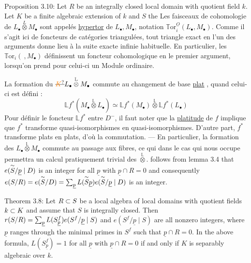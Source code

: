 Proposition 3.10: Let $R$ be an integrally closed local domain with quotient field $k$. Let $K$ be a finite algebraic extension of $k$ and $S$ the
Les  faisceaux de cohomologie de $L_{\bullet}\overset{L}{\otimes}M_{\bullet}$ sont appelés \uline{hypertor} de $L_{\bullet},M_{\bullet}$, notation $\mathbb T\mathrm{or}_i^{\underline O}(L_{\bullet},M_{\bullet})$.  Comme il s'agit ici de foncteurs  de catégories triangulées, tout triangle exact en l'un des arguments donne lieu à la suite exacte infinie habituelle. En particulier, les $\mathbb T\mathrm{or}_i(\ ,M_{\bullet})$ définissent un foncteur cohomologique en le premier argument, lorsqu'on prend pour celui-ci un Module ordinaire.

La formation du $\deleted{\unsure{K}}L_{\bullet}\overset{\mathbb L}{\otimes}M_{\bullet}$ commute au changement de base \uline{plat} , quand celui-ci est défini  : \deleted{\unsure{[mais alors}}
\[
\boxed{\mathbb L f^*(M_{\bullet}\overset{\mathbb L}{\otimes}L_{\bullet})\simeq\mathbb L f^*(M_{\bullet})\overset{\mathbb L}{\otimes}\mathbb L f^*(L_{\bullet})}
\]
Pour définir le foncteur  $\mathbb L f^*$ entre $D^-$, il faut noter que la \uline{platitude} de $f$ implique que $f^*$ transforme quasi-isomorphismes en quasi-isomorphismes. D'autre part, $f^*$ transforme plats en plats, d'où la commutation.
--- En particulier, la formation des $L_{\bullet}\overset{\mathbb L}{\otimes}M_{\bullet}$ commute au passage aux fibres, ce qui dans le cas qui nous occupe permettra  un calcul pratiquement trivial des $\overset{\mathbb L}{\otimes}$.
follows from lemma 3.4 that $e(\overset{\sim}{S}/\underline p\mid D)$ is an integer for all $\underline p$ with $\underline p\cap R=0$ and consequently $e(S/R)=e(\overset{\sim}{S}/D)=\sum_{\underline p}L(\overset{\sim}{S}\underline p)e(\overset{\sim}{S}/\underline p\mid D)$ is an integer.

Theorem 3.8: Let $R\subset S$ be a local algebra of local domains with quotient fields $k\subset K$ and assume that $S$ is integrally closed. Then $r(S/R)=\sum_{\underline p}L(S^f_{\underline p})e(S^f/\underline p\mid S)$ and $e(S^f/\underline p\mid S)$ are all nonzero integers, where $\underline p$ ranges through the minimal primes in $S^f$ such that $\underline p\cap R=0$. In the above formula, $L(S^f_{\underline p})=1$ for all $\underline p$ with $\underline p\cap R=0$ if and only if $K$ is separably algebraic over $k$.

